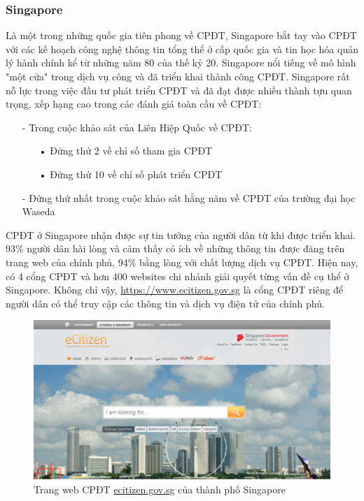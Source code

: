 \documentclass[a4paper]{article}
\begin{document}
\subsubsection{Singapore}
Là một trong những quốc gia tiên phong về CPĐT, Singapore bắt tay vào CPĐT với các kế hoạch công nghệ thông tin tổng thể ở cấp quốc gia và tin học hóa quản lý hành chính kể từ những năm 80 của thế kỷ 20. Singapore nổi tiếng về mô hình "một cửa" trong dịch vụ công và đã triển khai thành công CPĐT. Singapore rất nỗ lực trong việc đầu tư phát triển CPĐT và đã đạt được nhiều thành tựu quan trọng, xếp hạng cao trong các đánh giá toàn cầu về CPĐT:
\begin{itemize}
	\item[-]Trong cuộc khảo sát của Liên Hiệp Quốc về CPĐT:
	\begin{itemize}
	\item[•]Đứng thứ 2 về chỉ số tham gia CPĐT
	\item[•]Đứng thứ 10 về chỉ số phát triển CPĐT
	\end{itemize}
	\item[-]Đứng thứ nhất trong cuộc khảo sát hằng năm về CPĐT của trường đại học Waseda
\end{itemize}
CPĐT ở Singapore nhận được sự tin tưởng của người dân từ khi được triển khai. 93\% người dân hài lòng và cảm thấy có ích về những thông tin được đăng trên trang web của chính phủ, 94\% bằng lòng với chất lượng dịch vụ CPĐT.
Hiện nay, có 4 cổng CPĐT và hơn 400 websites chi nhánh giải quyết từng vấn đề cụ thể ở Singapore. Không chỉ vậy, \url{https://www.ecitizen.gov.sg} là cổng CPĐT riêng để người dân có thể truy cập các thông tin và dịch vụ điện tử của chính phủ.	
\begin{center}
    \begin{figure}[h]
    \begin{center}
     \includegraphics[scale=.4]{singapore.PNG}
    \end{center}
    \caption{Trang web CPĐT \url{ecitizen.gov.sg} của thành phố Singapore}
    \label{refhinh2}
    \end{figure}
\end{center}
\end{document}
